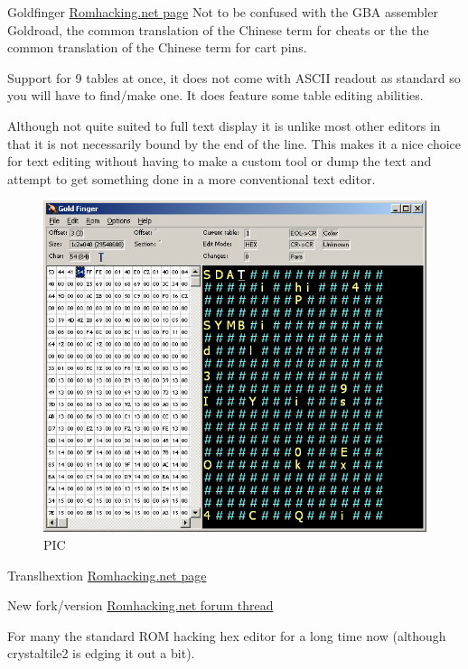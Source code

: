 \documentclass[
]{book}
\begin{document}
Goldfinger \href{http://www.romhacking.net/utilities/204/}{Romhacking.net page} Not to be confused with the GBA assembler Goldroad, the common translation of the Chinese term for cheats or the the common translation of the Chinese term for cart pins.

Support for 9 tables at once, it does not come with ASCII readout as standard so you will have to find/make one. It does feature some table editing abilities.

Although not quite suited to full text display it is unlike most other editors in that it is not necessarily bound by the end of the line. This makes it a nice choice for text editing without having to make a custom tool or dump the text and attempt to get something done in a more conventional text editor.

\begin{figure}
\centering
\includegraphics{images/10_home_fast6191_romhackingguide_unrenamed_file___omhackingguidehexeditorsshowcasegoldfinger1.png}
\caption{PIC}
\end{figure}

Translhextion \href{http://www.romhacking.net/utilities/219/\%20}{Romhacking.net page}

New fork/version \href{http://www.romhacking.net/forum/topic,14373.0.html}{Romhacking.net forum thread}

For many the standard ROM hacking hex editor for a long time now (although crystaltile2 is edging it out a bit).
\end{document}
